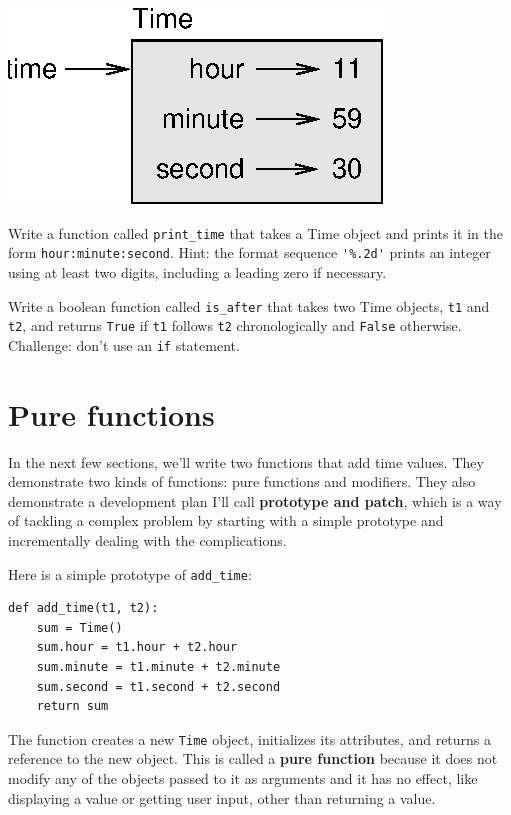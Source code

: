 \documentclass[10pt]{book}
\begin{document}
{

\beforefig
\centerline{\includegraphics{figs/time.eps}}
\afterfig

\begin{ex}
\label{printtime}
Write a function called \verb"print_time" that takes a 
Time object and prints it in the form {\tt hour:minute:second}.
Hint: the format sequence \verb"'%.2d'" prints an integer using
at least two digits, including a leading zero if necessary.
\end{ex}

\begin{ex}
\label{is_after}


Write a boolean function called \verb"is_after" that
takes two Time objects, {\tt t1} and {\tt t2}, and
returns {\tt True} if {\tt t1} follows {\tt t2} chronologically and
{\tt False} otherwise.  Challenge: don't use an {\tt if} statement.
\end{ex}


\section{Pure functions}


In the next few sections, we'll write two functions that add time
values.  They demonstrate two kinds of functions: pure functions and
modifiers.  They also demonstrate a development plan I'll call {\bf
  prototype and patch}, which is a way of tackling a complex problem
by starting with a simple prototype and incrementally dealing with the
complications.

Here is a simple prototype of \verb"add_time":

\beforeverb
\begin{verbatim}
def add_time(t1, t2):
    sum = Time()
    sum.hour = t1.hour + t2.hour
    sum.minute = t1.minute + t2.minute
    sum.second = t1.second + t2.second
    return sum
\end{verbatim}
\afterverb
%
The function creates a new {\tt Time} object, initializes its
attributes, and returns a reference to the new object.  This is called
a {\bf pure function} because it does not modify any of the objects
passed to it as arguments and it has no effect,
like displaying a value or getting user input, 
other than returning a value.

}
\end{document}
